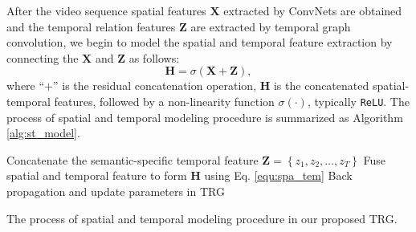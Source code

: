 \documentclass[conference,compsoc]{IEEEtran}
\begin{document}
    After the video sequence spatial features $\mathbf{X}$ extracted by ConvNets are obtained and the temporal relation features $\mathbf{Z}$ are extracted by temporal graph convolution, we begin to model the spatial and temporal feature extraction by connecting the $\mathbf{X}$ and $\mathbf{Z}$ as follows:
    \begin{equation}
        \mathbf{H}=\sigma \left( \mathbf{X} + \mathbf{Z}\right),
        \label{equ:spa_tem}
    \end{equation}
    where ``$+$'' is the residual concatenation operation, $\mathbf{H}$ is the concatenated spatial-temporal features, followed by a non-linearity function $\sigma\left( \cdot\right)$, typically \texttt{ReLU}. The process of spatial and temporal modeling procedure is summarized as Algorithm \ref{alg:st_model}.
    
\begin{algorithm}[ht]

	\BlankLine


	Concatenate the semantic-specific temporal feature $\mathbf{Z} = \left\lbrace z_1, z_2, \ldots, z_T \right\rbrace$\; 
Fuse spatial and temporal feature to form $\mathbf{H}$ using Eq. \ref{equ:spa_tem}\;
	Back propagation and update parameters in TRG\;
	\caption{The process of spatial and temporal modeling procedure in our proposed TRG.}
	\label{alg:st_model}
    \end{algorithm}
    
\end{document}
